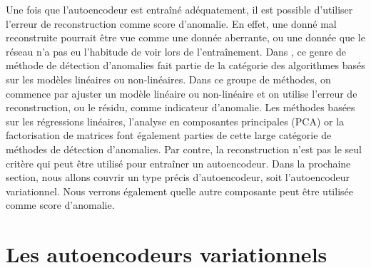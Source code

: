 Une fois que l'autoencodeur est entraîné adéquatement, il est possible d'utiliser l'erreur de reconstruction comme score d'anomalie. En effet, une donné mal reconstruite pourrait être vue comme une donnée aberrante, ou une donnée que le réseau n'a pas eu l'habitude de voir lors de l'entraînement. Dans  \cite{10.5555/3086742}, ce genre de méthode de détection d'anomalies fait partie de la catégorie des algorithmes basés sur les modèles linéaires ou non-linéaires. Dans ce groupe de méthodes, on commence par ajuster un modèle linéaire ou non-linéaire et on utilise l'erreur de reconstruction, ou le résidu, comme indicateur d'anomalie. Les méthodes basées sur les régressions linéaires, l'analyse en composantes principales (PCA) or la factorisation de matrices font également parties de cette large catégorie de méthodes de détection d'anomalies. Par contre, la reconstruction n'est pas le seul critère qui peut être utilisé pour entraîner un autoencodeur. Dans la prochaine section, nous allons couvrir un type précis d'autoencodeur, soit l'autoencodeur variationnel. Nous verrons également quelle autre composante peut être utilisée comme score d'anomalie.

\section{Les autoencodeurs variationnels} \label{background-vae}


